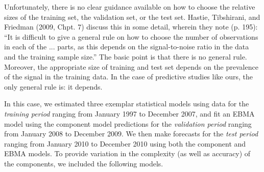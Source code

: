 Unfortunately, there is no clear guidance available on how to choose
the relative sizes of the training set, the validation set, or the
test set.  Hastie, Tibshirani, and Friedman (2009, Chpt. 7) discuss
this in some detail, wherein they note (p. 195): ``It is difficult to
give a general rule on how to choose the number of observations in
each of the ... parts, as this depends on the signal-to-noise ratio in
the data and the training sample size.''  The basic point is that there is
no general rule. Moreover, the appropriate size of training and test set
depends on the prevalence of the signal in the training data. In the
case of predictive studies like ours, the only general rule is: it
depends.  %

In this case, we estimated three exemplar statistical models using
data for the \textit{training period} ranging from January
1997 to December 2007, and fit an EBMA
model using the component model predictions for the \textit{validation
  period} ranging from January 2008 to December 2009.  We then make
forecasts for the \textit{test period} ranging from January 2010 to December
2010 using both the component and EBMA models.  To provide variation
in the complexity (as well as accuracy) of the components, we included
the following models.



